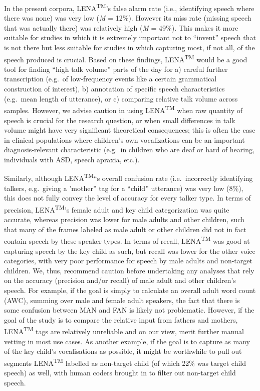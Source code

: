 \documentclass[english,floatsintext,man]{apa6}
\begin{document}
In the present corpora, LENA\textsuperscript{TM}'s false alarm rate
(i.e., identifying speech where there was none) was very low (\emph{M} =
12\%). However its miss rate (missing speech that was actually there)
was relatively high (\emph{M} = 49\%). This makes it more suitable for
studies in which it is extremely important not to \enquote{invent}
speech that is not there but less suitable for studies in which
capturing most, if not all, of the speech produced is crucial. Based on
these findings, LENA\textsuperscript{TM} would be a good tool for
finding \enquote{high talk volume} parts of the day for a) careful
further transcription (e.g.~of low-frequency events like a certain
grammatical construction of interest), b) annotation of specific speech
characteristics (e.g.~mean length of utterance), or c) comparing
relative talk volume across samples. However, we advise caution in using
LENA\textsuperscript{TM} when raw quantity of speech is crucial for the
research question, or when small differences in talk volume might have
very significant theoretical consequences; this is often the case in
clinical populations where children's own vocalizations can be an
important diagnosis-relevant characteristic (e.g.~in children who are
deaf or hard of hearing, individuals with ASD, speech apraxia, etc.).

Similarly, although LENA\textsuperscript{TM}\enquote{s overall confusion
rate (i.e.~incorrectly identifying talkers, e.g.~giving a 'mother} tag
for a \enquote{child} utterance) was very low (8\%), this does not fully
convey the level of accuracy for every talker type. In terms of
precision, LENA\textsuperscript{TM}'s female adult and key child
categorization was quite accurate, whereas precision was lower for male
adults and other children, such that many of the frames labeled as male
adult or other children did not in fact contain speech by these speaker
types. In terms of recall, LENA\textsuperscript{TM} was good at
capturing speech by the key child as such, but recall was lower for the
other voice categories, with very poor performance for speech by male
adults and non-target children. We, thus, recommend caution before
undertaking any analyses that rely on the accuracy (precision and/or
recall) of male adult and other children's speech. For example, if the
goal is simply to calculate an overall adult word count (AWC), summing
over male and female adult speakers, the fact that there is some
confusion between MAN and FAN is likely not problematic. However, if the
goal of the study is to compare the relative input from fathers and
mothers, LENA\textsuperscript{TM} tags are relatively unreliable and on
our view, merit further manual vetting in most use cases. As another
example, if the goal is to capture as many of the key child's
vocalisations as possible, it might be worthwhile to pull out segments
LENA\textsuperscript{TM} labelled as non-target child (of which 22\% was
target child speech) as well, with human coders brought in to filter out
non-target child speech.
\end{document}
